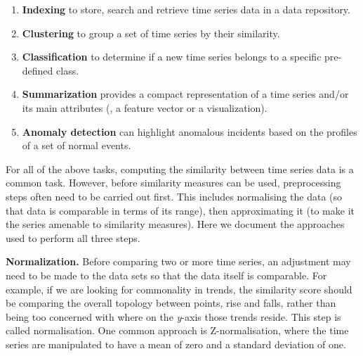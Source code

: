 \begin{enumerate}
\item \textbf{Indexing} to store, search and retrieve time series data in a data repository.\\
\item \textbf{Clustering} to group a set of time series by their similarity. \\
\item \textbf{Classification} to determine if a new time series belongs to a specific pre-defined class.\\ 
\item \textbf{Summarization} provides a compact representation of a time series and/or its main attributes (\eg, a feature vector or a visualization). \\
\item \textbf{Anomaly detection} can highlight anomalous incidents based on the profiles of a set of normal events.\\
\end{enumerate}

For all of the above tasks, computing the similarity between time series data is a common task.
However, before similarity measures can be used, preprocessing steps often need to be carried out first.
This includes normalising the data (so that data is comparable in terms of its range), then approximating it (to make it the series amenable to similarity measures).
Here we document the approaches used to perform all three steps.


\noindent\textbf{Normalization.}
Before comparing two or more time series, an adjustment may need to be made to the data sets so that the data itself is comparable.
For example, if we are looking for commonality in trends, the similarity score should be comparing the overall topology between points, rise and falls, rather than being too concerned with where on the \emph{y}-axis those trends reside.
This step is called normalisation.
One common approach is Z-normalisation, where the time series are manipulated to have a mean of zero and a standard deviation of one. 


